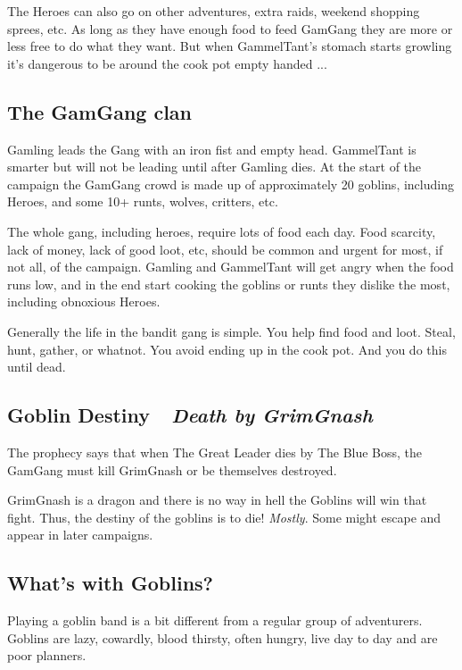 \noindent The Heroes can also go on other adventures, extra raids, weekend shopping sprees, etc. As long as they have enough food to feed GamGang they are more or less free to do what they want. But when GammelTant's stomach starts growling it's dangerous to be around the cook pot empty handed ...


\subsection*{The GamGang clan}

Gamling leads the Gang with an iron fist and empty head. GammelTant is smarter but will not be leading until after Gamling dies.
At the start of the campaign the GamGang crowd is made up of approximately 20 goblins, including Heroes, and some 10+ runts, wolves, critters, etc. 

The whole gang, including heroes, require lots of food each day. Food scarcity, lack of money, lack of good loot, etc, should be common and urgent for most, if not all, of the campaign. Gamling and GammelTant will get angry when the food runs low, and in the end start cooking the goblins or runts they dislike the most, including obnoxious Heroes.

Generally the life in the bandit gang is simple. You help find food and loot. Steal, hunt, gather, or whatnot. You avoid ending up in the cook pot. And you do this until dead.


\subsection*{Goblin Destiny~\mdash~\emph{Death by GrimGnash}}   %

The prophecy says that when The Great Leader dies by The Blue Boss, the GamGang must kill GrimGnash or be themselves destroyed.

GrimGnash is a dragon and there is no way in hell the Goblins will win that fight. Thus, the destiny of the goblins is to die! \emph{Mostly}. Some might escape and appear in later campaigns.


\subsection*{What's with Goblins?}

Playing a goblin band is a bit different from a regular group of adventurers. Goblins are lazy, cowardly, blood thirsty, often hungry, live day to day and are poor planners.

